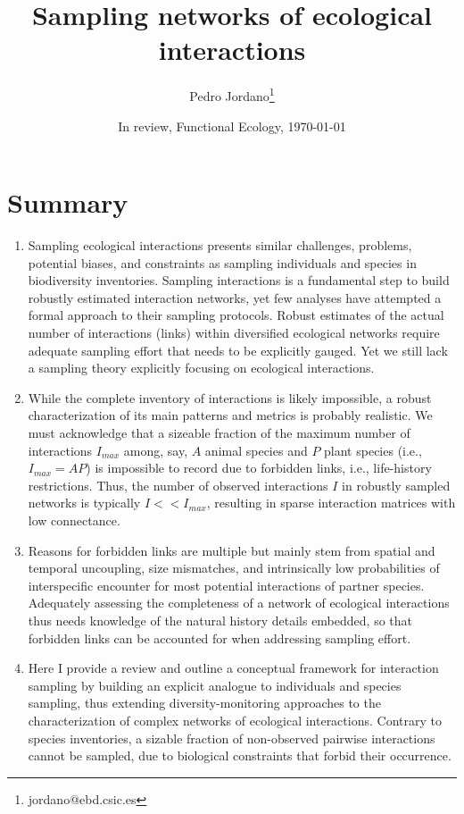 \documentclass[12pt]{article}
\title{Sampling networks of ecological interactions}
\author[a]{Pedro Jordano\thanks{jordano@ebd.csic.es}}
\affil[a]{Integrative Ecology Group, Estaci\'on Biol\'ogica de Do\~nana, Consejo Superior de Investigaciones Cient\'ificas (EBD-CSIC), Avenida Americo Vespucio s\slash n, E--41092 Sevilla, Spain}
\date{In review, Functional Ecology, \today}
\begin{document}
\maketitle
\section*{Summary}
\begin{enumerate}
\item Sampling ecological interactions presents similar challenges, problems, potential biases, and constraints as sampling individuals and species in biodiversity inventories. Sampling interactions is a fundamental step to build robustly estimated interaction networks, yet few analyses have attempted a formal approach to their sampling protocols. Robust estimates of the actual number of interactions (links) within diversified ecological networks require adequate sampling effort that needs to be explicitly gauged. Yet we still lack a sampling theory explicitly focusing on ecological interactions.

\item While the complete inventory of interactions is likely impossible, a robust characterization of its main patterns and metrics is probably realistic. We must acknowledge that a sizeable fraction of the maximum number of interactions $I_{max}$ among, say, $A$ animal species and $P$ plant species (i.e., $I_{max}= AP$) is impossible to record due to forbidden links, i.e., life-history restrictions. Thus, the number of observed interactions $I$ in robustly sampled networks is typically $I<<I_{max}$, resulting in sparse interaction matrices with low connectance.

\item Reasons for forbidden links are multiple but mainly stem from spatial and temporal uncoupling, size mismatches, and intrinsically low probabilities of interspecific encounter for most potential interactions of partner species. Adequately assessing the completeness of a network of ecological interactions thus needs knowledge of the natural history details embedded, so that forbidden links can be accounted for when addressing sampling effort.

\item Here I provide a review and outline a conceptual framework for interaction sampling by building an explicit analogue to individuals and species sampling, thus extending diversity-monitoring approaches to the characterization of complex networks of ecological interactions. Contrary to species inventories, a sizable fraction of non-observed pairwise interactions cannot be sampled, due to biological constraints that forbid their occurrence.  


\end{enumerate}
\end{document}
